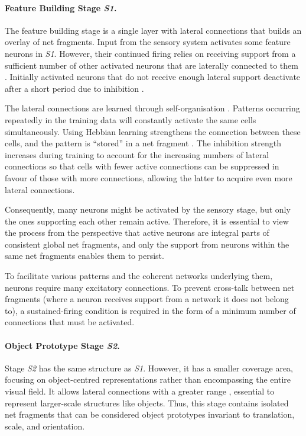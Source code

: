 \paragraph{Feature Building Stage \emph{S1}.} The feature building stage is a single layer with lateral connections  that builds an overlay of net fragments. Input from the sensory system activates some feature neurons in \emph{S1}. However, their continued firing relies on receiving support from a sufficient number of other activated neurons that are laterally connected to them . Initially activated neurons that do not receive enough lateral support deactivate after a short period due to inhibition .

The lateral connections are learned through self-organisation \cite{hebb_organization_1949}. Patterns occurring repeatedly in the training data will constantly activate the same cells simultaneously. Using Hebbian learning \cite{hebb_organization_1949} strengthens the connection between these cells, and the pattern is ``stored'' in a net fragment \cite{von_der_malsburg_concerning_2018}. The inhibition strength increases during training to account for the increasing numbers of lateral connections so that cells with fewer active connections can be suppressed in favour of those with more connections, allowing the latter to acquire even more lateral connections.

Consequently, many neurons might be activated by the sensory stage, but only the ones supporting each other remain active.
Therefore, it is essential to view the process from the perspective that active neurons are integral parts of consistent global net fragments, and only the support from neurons within the same net fragments enables them to persist.

To facilitate various patterns and the coherent networks underlying them, neurons require many excitatory connections. To prevent cross-talk between net fragments (where a neuron receives support from a network it does not belong to), a sustained-firing condition is required in the form of a minimum number of connections that must be activated.

\paragraph{Object Prototype Stage \emph{S2}.} Stage \emph{S2} has the same structure as \emph{S1}. However, it has a smaller coverage area, focusing on object-centred representations rather than encompassing the entire visual field. It allows lateral connections with a greater range , essential to represent larger-scale structures like objects. 
Thus, this stage contains isolated net fragments that can be considered object prototypes invariant to translation, scale, and orientation.

